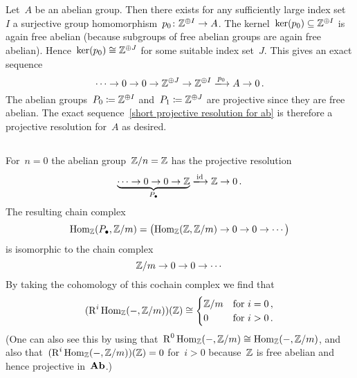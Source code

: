 \section{}





\subsection{}

Let~$A$ be an abelian group.
Then there exists for any sufficiently large index set~$I$ a surjective group homomorphism~$p_0 \colon \mathbb{Z}^{\oplus I} \to A$.
The kernel~$\ker(p_0) \subseteq \mathbb{Z}^{\oplus I}$ is again free abelian (because subgroups of free abelian groups are again free abelian).
Hence~$\ker(p_0) \cong \mathbb{Z}^{\oplus J}$ for some suitable index set~$J$.
This gives an exact sequence
\begin{equation}
  \label{short projective resolution for ab}
  \dotsb
  \to
  0
  \to
  0
  \to
  \Integer^{\oplus J}
  \to
  \Integer^{\oplus I}
  \xlongto{p_0}
  A
  \to
  0 \,.
\end{equation}
The abelian groups~$P_0 \coloneqq \mathbb{Z}^{\oplus I}$ and~$P_1 \coloneqq \mathbb{Z}^{\oplus J}$ are projective since they are free abelian.
The exact sequence~\eqref{short projective resolution for ab} is therefore a projective resolution for~$A$ as desired.





\subsection{}

For~$n = 0$ the abelian group~$\mathbb{Z}/n = \mathbb{Z}$ has the projective resolution
\[
  \underbrace{
  \dotsb
  \to
  0
  \to
  0
  \to
  \Integer
  }_{\Pcc}
  \xlongto{\id}
  \Integer
  \to
  0 \,.
\]
The resulting chain complex
\[
  \operatorname{Hom}_{\mathbb{Z}}(P_\bullet, \mathbb{Z}/m)
  =
  \bigl(
    \operatorname{Hom}_{\mathbb{Z}}(\mathbb{Z},\mathbb{Z}/m)
    \to
    0
    \to
    0
    \to
    \dotsb
  \bigr)
\]
is isomorphic to the chain complex
\[
  \mathbb{Z}/m
  \to
  0
  \to
  0
  \to
  \dotsb
\]
By taking the cohomology of this cochain complex we find that
\[
  ( \operatorname{R}^i \operatorname{Hom}_{\mathbb{Z}}(-,\mathbb{Z}/m) )(\mathbb{Z})
  \cong
  \begin{cases}
    \mathbb{Z}/m  & \text{for~$i = 0$}  \,, \\
    0           & \text{for~$i > 0$}  \,.
  \end{cases}
\]
(One can also see this by using that~$\operatorname{R}^0 \operatorname{Hom}_{\mathbb{Z}}(-,\mathbb{Z}/m) \cong \operatorname{Hom}_{\mathbb{Z}}(-,\mathbb{Z}/m)$, and also that~$(\operatorname{R}^i \operatorname{Hom}_{\mathbb{Z}}(-,\mathbb{Z}/m))(\mathbb{Z}) = 0$ for~$i > 0$ because~$\mathbb{Z}$ is free abelian and hence projective in~$\mathbf{Ab}$.)

